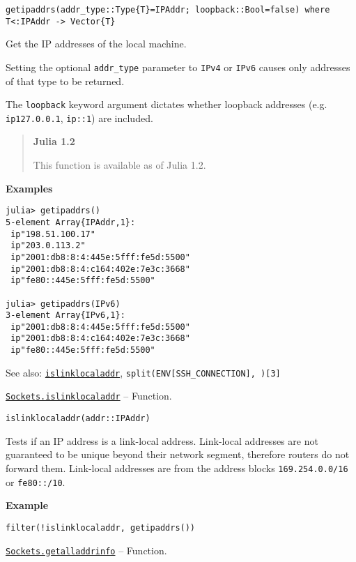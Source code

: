 \begin{adjustwidth}{2em}{0pt}


\begin{verbatim}
getipaddrs(addr_type::Type{T}=IPAddr; loopback::Bool=false) where T<:IPAddr -> Vector{T}
\end{verbatim}

Get the IP addresses of the local machine.

Setting the optional \texttt{addr\_type} parameter to \texttt{IPv4} or \texttt{IPv6} causes only addresses of that type to be returned.

The \texttt{loopback} keyword argument dictates whether loopback addresses (e.g. \texttt{ip{\textquotedbl}127.0.0.1{\textquotedbl}}, \texttt{ip{\textquotedbl}::1{\textquotedbl}}) are included.

\begin{quote}
\textbf{Julia 1.2}

This function is available as of Julia 1.2.

\end{quote}
\textbf{Examples}


\begin{verbatim}
julia> getipaddrs()
5-element Array{IPAddr,1}:
 ip"198.51.100.17"
 ip"203.0.113.2"
 ip"2001:db8:8:4:445e:5fff:fe5d:5500"
 ip"2001:db8:8:4:c164:402e:7e3c:3668"
 ip"fe80::445e:5fff:fe5d:5500"

julia> getipaddrs(IPv6)
3-element Array{IPv6,1}:
 ip"2001:db8:8:4:445e:5fff:fe5d:5500"
 ip"2001:db8:8:4:c164:402e:7e3c:3668"
 ip"fe80::445e:5fff:fe5d:5500"
\end{verbatim}

See also: \hyperlink{1053703384713953230}{\texttt{islinklocaladdr}}, \texttt{split(ENV[{\textquotedbl}SSH\_CONNECTION{\textquotedbl}], {\textquotesingle} {\textquotesingle})[3]}



\end{adjustwidth}
\hypertarget{1053703384713953230}{}
\hyperlink{1053703384713953230}{\texttt{Sockets.islinklocaladdr}}  -- {Function.}

\begin{adjustwidth}{2em}{0pt}


\begin{verbatim}
islinklocaladdr(addr::IPAddr)
\end{verbatim}

Tests if an IP address is a link-local address. Link-local addresses are not guaranteed to be unique beyond their network segment, therefore routers do not forward them. Link-local addresses are from the address blocks \texttt{169.254.0.0/16} or \texttt{fe80::/10}.

\textbf{Example}


\begin{verbatim}
filter(!islinklocaladdr, getipaddrs())
\end{verbatim}



\end{adjustwidth}
\hypertarget{14820421424669368163}{}
\hyperlink{14820421424669368163}{\texttt{Sockets.getalladdrinfo}}  -- {Function.}

